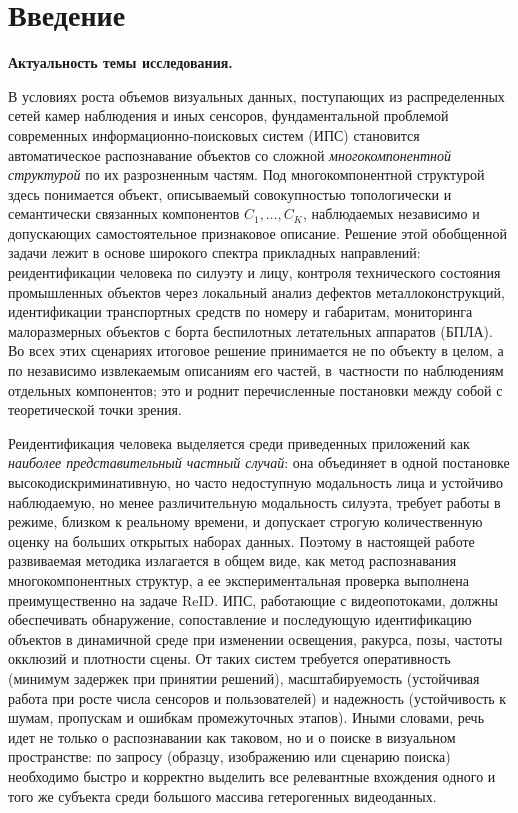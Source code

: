 \chapter*{Введение}

\textbf{Актуальность темы исследования.}

В условиях роста объемов визуальных данных, поступающих из
распределенных сетей камер наблюдения и иных сенсоров, фундаментальной
проблемой современных информационно‑поисковых систем (ИПС) становится
автоматическое распознавание объектов со сложной \emph{многокомпонентной
структурой} по их разрозненным частям. Под многокомпонентной структурой
здесь понимается объект, описываемый совокупностью топологически и
семантически связанных компонентов $C_1,\ldots,C_K$, наблюдаемых независимо
и допускающих самостоятельное признаковое описание. Решение этой
обобщенной задачи лежит в основе широкого спектра прикладных направлений:
реидентификации человека по силуэту и лицу, контроля технического состояния
промышленных объектов через локальный анализ дефектов металлоконструкций,
идентификации транспортных средств по номеру и габаритам, мониторинга
малоразмерных объектов с борта беспилотных летательных аппаратов (БПЛА).
Во всех этих сценариях итоговое решение принимается не по объекту в целом,
а по независимо извлекаемым описаниям его частей, в~частности по
наблюдениям отдельных компонентов; это и роднит перечисленные постановки
между собой с теоретической точки зрения.

Реидентификация человека выделяется среди приведенных приложений как
\emph{наиболее представительный частный случай}: она объединяет в одной
постановке высокодискриминативную, но часто недоступную модальность лица
и устойчиво наблюдаемую, но менее различительную модальность силуэта,
требует работы в режиме, близком к реальному времени, и допускает строгую
количественную оценку на больших открытых наборах данных. Поэтому в
настоящей работе развиваемая методика излагается в общем виде, как метод
распознавания многокомпонентных структур, а ее экспериментальная проверка
выполнена преимущественно на задаче ReID. ИПС, работающие с видеопотоками,
должны обеспечивать обнаружение, сопоставление и последующую идентификацию
объектов в динамичной среде при изменении освещения, ракурса, позы, частоты
окклюзий и плотности сцены. От таких систем требуется оперативность
(минимум задержек при принятии решений), масштабируемость (устойчивая
работа при росте числа сенсоров и пользователей) и надежность (устойчивость
к шумам, пропускам и ошибкам промежуточных этапов). Иными словами, речь
идет не только о распознавании как таковом, но и о поиске в визуальном
пространстве: по запросу (образцу, изображению или сценарию поиска)
необходимо быстро и корректно выделить все релевантные вхождения одного и
того же субъекта среди большого массива гетерогенных видеоданных.

